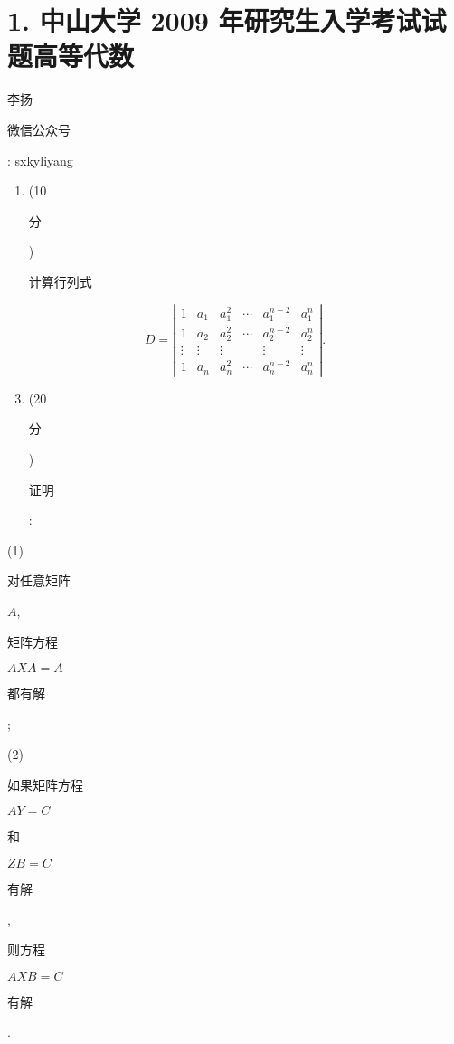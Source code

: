 \documentclass[10pt]{article}
\begin{document}
\section{1. 中山大学 2009 年研究生入学考试试题高等代数}
\begin{CJK}{UTF8}{mj}李扬\end{CJK}

\begin{CJK}{UTF8}{mj}微信公众号\end{CJK}: sxkyliyang

\begin{enumerate}
  \item (10 \begin{CJK}{UTF8}{mj}分\end{CJK}) \begin{CJK}{UTF8}{mj}计算行列式\end{CJK}
\end{enumerate}
$$
D=\left|\begin{array}{cccccc}
1 & a_{1} & a_{1}^{2} & \cdots & a_{1}^{n-2} & a_{1}^{n} \\
1 & a_{2} & a_{2}^{2} & \cdots & a_{2}^{n-2} & a_{2}^{n} \\
\vdots & \vdots & \vdots & & \vdots & \vdots \\
1 & a_{n} & a_{n}^{2} & \cdots & a_{n}^{n-2} & a_{n}^{n}
\end{array}\right| .
$$

\begin{enumerate}
  \setcounter{enumi}{2}
  \item (20 \begin{CJK}{UTF8}{mj}分\end{CJK}) \begin{CJK}{UTF8}{mj}证明\end{CJK}:
\end{enumerate}
(1) \begin{CJK}{UTF8}{mj}对任意矩阵\end{CJK} $A$, \begin{CJK}{UTF8}{mj}矩阵方程\end{CJK} $A X A=A$ \begin{CJK}{UTF8}{mj}都有解\end{CJK};

(2) \begin{CJK}{UTF8}{mj}如果矩阵方程\end{CJK} $A Y=C$ \begin{CJK}{UTF8}{mj}和\end{CJK} $Z B=C$ \begin{CJK}{UTF8}{mj}有解\end{CJK}, \begin{CJK}{UTF8}{mj}则方程\end{CJK} $A X B=C$ \begin{CJK}{UTF8}{mj}有解\end{CJK}.
\end{document}
